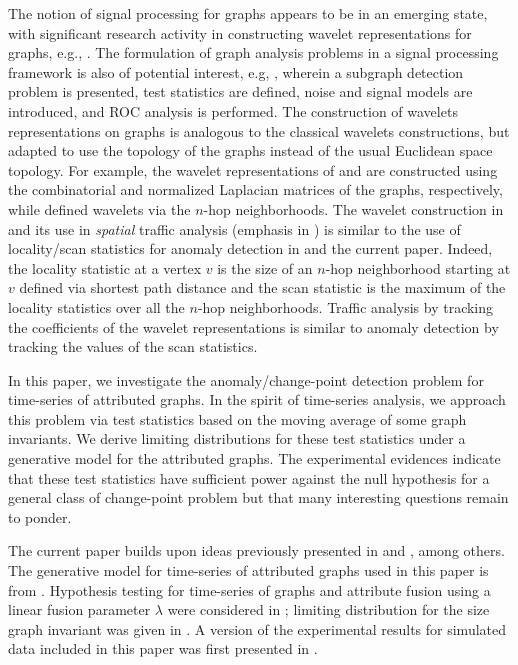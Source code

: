 \documentclass[10pt,draftclsnofoot,onecolumn]{IEEEtran}
\theoremstyle{definition}
\begin{document}
The notion of signal processing for graphs appears to be in an
emerging state, with significant research activity in constructing
wavelet representations for graphs, e.g.,
\cite{hammond10:_wavel,r.coifman06:_diffus,crovella03:_graph,narangss:_perfec}.
The formulation of graph analysis problems in a signal processing
framework is also of potential interest, e.g,
\cite{miller10:_towar_euclid}, wherein a subgraph detection problem is
presented, test statistics are defined, noise and signal models are
introduced, and ROC analysis is performed. The construction of
wavelets representations on graphs is analogous to the classical
wavelets constructions, but adapted to use the topology of the graphs
instead of the usual Euclidean space topology. For example, the
wavelet representations of \cite{hammond10:_wavel} and
\cite{r.coifman06:_diffus} are constructed using the combinatorial and
normalized Laplacian matrices of the graphs, respectively, while
\cite{crovella03:_graph} defined wavelets via the $n$-hop
neighborhoods. The wavelet construction in \cite{crovella03:_graph}
and its use in {\em spatial} traffic analysis (emphasis in 
\cite{crovella03:_graph}) is similar to the use of locality/scan
statistics for anomaly detection in
\cite{priebe05:_scan_statis_enron_graph} and the current
paper. Indeed, the locality statistic at a vertex $v$ is the size of an
$n$-hop neighborhood starting at $v$ defined via shortest path
distance and the scan statistic is the maximum of the locality
statistics over all the $n$-hop neighborhoods. Traffic analysis by
tracking the coefficients of the wavelet representations is similar to
anomaly detection by tracking the values of the scan statistics.

In this paper, we investigate the anomaly/change-point detection
problem for time-series of attributed graphs. In the spirit of
time-series analysis, we approach this problem via test statistics
based on the moving average of some graph invariants. We derive
limiting distributions for these test statistics under a generative
model for the attributed graphs. The experimental evidences indicate that these
test statistics have sufficient power against the null hypothesis for
a general class of change-point problem but that many interesting
questions remain to ponder.

The current paper builds upon ideas previously presented in
\cite{lee11} and \cite{priebe11:_attrib}, among others. The generative
model for time-series of attributed graphs used in this paper is from
\cite{lee11}. Hypothesis testing for time-series of graphs and
attribute fusion using a linear fusion parameter $\lambda$ were
considered in \cite{lee11,priebe11:_attrib}; limiting distribution for
the size graph invariant was given in \cite{lee11}. A version of the
experimental results for simulated data included in this paper was first
presented in \cite{priebe11:_attrib}.
\end{document}
